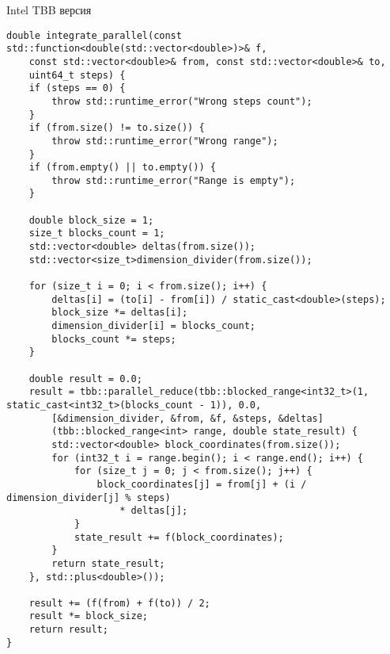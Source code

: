 \documentclass{report}
\begin{document}
\par Intel TBB версия
\begin{lstlisting}
double integrate_parallel(const std::function<double(std::vector<double>)>& f,
    const std::vector<double>& from, const std::vector<double>& to,
    uint64_t steps) {
    if (steps == 0) {
        throw std::runtime_error("Wrong steps count");
    }
    if (from.size() != to.size()) {
        throw std::runtime_error("Wrong range");
    }
    if (from.empty() || to.empty()) {
        throw std::runtime_error("Range is empty");
    }

    double block_size = 1;
    size_t blocks_count = 1;
    std::vector<double> deltas(from.size());
    std::vector<size_t>dimension_divider(from.size());

    for (size_t i = 0; i < from.size(); i++) {
        deltas[i] = (to[i] - from[i]) / static_cast<double>(steps);
        block_size *= deltas[i];
        dimension_divider[i] = blocks_count;
        blocks_count *= steps;
    }

    double result = 0.0;
    result = tbb::parallel_reduce(tbb::blocked_range<int32_t>(1, static_cast<int32_t>(blocks_count - 1)), 0.0,
        [&dimension_divider, &from, &f, &steps, &deltas]
        (tbb::blocked_range<int> range, double state_result) {
        std::vector<double> block_coordinates(from.size());
        for (int32_t i = range.begin(); i < range.end(); i++) {
            for (size_t j = 0; j < from.size(); j++) {
                block_coordinates[j] = from[j] + (i / dimension_divider[j] % steps)
                    * deltas[j];
            }
            state_result += f(block_coordinates);
        }
        return state_result;
    }, std::plus<double>());

    result += (f(from) + f(to)) / 2;
    result *= block_size;
    return result;
}
\end{lstlisting}
\end{document}
